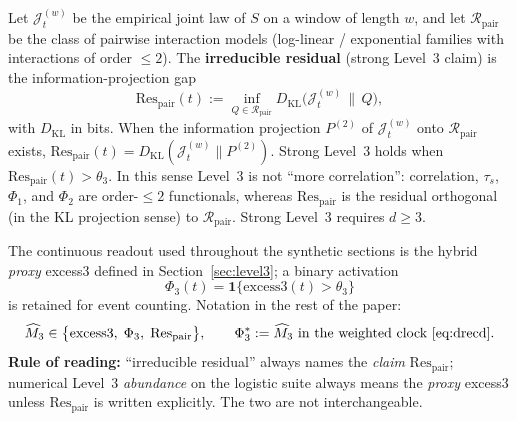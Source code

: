 \documentclass[11pt,a4paper]{article}
\begin{document}
Let $\mathcal{J}_t^{(w)}$ be the empirical joint law of $S$ on a window
of length $w$, and let $\mathcal{R}_{\mathrm{pair}}$ be the class of
pairwise interaction models (log-linear / exponential families with
interactions of order $\le 2$). The \textbf{irreducible residual}
(strong Level~3 claim) is the information-projection gap
\begin{equation}
\label{eq:res_pair}
\mathrm{Res}_{\mathrm{pair}}(t)
:=\inf_{Q\in\mathcal{R}_{\mathrm{pair}}}
D_{\mathrm{KL}}\bigl(\mathcal{J}_t^{(w)}\,\|\,Q\bigr),
\end{equation}
with $D_{\mathrm{KL}}$ in bits. When the information projection
$P^{(2)}$ of $\mathcal{J}_t^{(w)}$ onto $\mathcal{R}_{\mathrm{pair}}$
exists,
$\mathrm{Res}_{\mathrm{pair}}(t)=D_{\mathrm{KL}}(\mathcal{J}_t^{(w)}\|P^{(2)})$.
Strong Level~3 holds when $\mathrm{Res}_{\mathrm{pair}}(t)>\theta_3$.
In this sense Level~3 is not ``more correlation'': correlation,
$\tau_s$, $\Phi_1$, and $\Phi_2$ are order-$\le 2$ functionals, whereas
$\mathrm{Res}_{\mathrm{pair}}$ is the residual orthogonal (in the KL
projection sense) to $\mathcal{R}_{\mathrm{pair}}$. Strong Level~3
requires $d\ge 3$.

The continuous readout used throughout the synthetic sections is the
hybrid \emph{proxy} excess3 defined in Section~\ref{sec:level3}; a binary
activation
\begin{equation}
\label{eq:phi3}
\Phi_3(t)=\mathbf{1}\bigl\{\mathrm{excess3}(t)>\theta_3\bigr\}
\end{equation}
is retained for event counting. Notation in the rest of the paper:
\begin{equation}
\label{eq:M3_notation}
\widehat{M}_3
\in
\bigl\{\mathrm{excess3},\;\Phi_3,\;\mathrm{Res}_{\mathrm{pair}}\bigr\},
\qquad
\Phi_3^{\ast}:=\widehat{M}_3
\text{ in the weighted clock \eqref{eq:drecd}.}
\end{equation}
\textbf{Rule of reading:} ``irreducible residual'' always names the
\emph{claim} $\mathrm{Res}_{\mathrm{pair}}$; numerical Level~3
\emph{abundance} on the logistic suite always means the \emph{proxy}
excess3 unless $\mathrm{Res}_{\mathrm{pair}}$ is written explicitly. The
two are not interchangeable.
\end{document}
